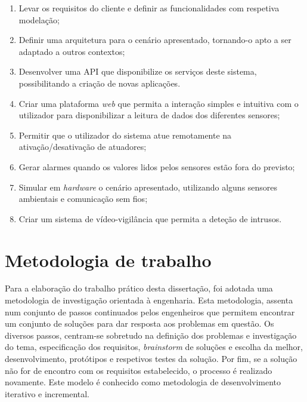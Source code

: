 \begin{enumerate}

	\item Levar os requisitos do cliente e definir as funcionalidades com respetiva modelação; 
	
	\item Definir uma arquitetura para o cenário apresentado, tornando-o apto a ser adaptado a outros contextos; 
	
	\item Desenvolver uma \ac{API} que disponibilize os serviços deste sistema, possibilitando a criação de novas aplicações.   
	
	\item Criar uma plataforma \textit{web} que permita a  interação simples e intuitiva com o utilizador para disponibilizar a leitura de dados dos diferentes sensores; 
	
	\item Permitir que o utilizador do sistema atue remotamente na ativação/desativação de atuadores; 
	
	
	\item Gerar alarmes quando os valores lidos pelos sensores estão fora do previsto; 
	
	\item Simular em \textit{hardware} o cenário apresentado, utilizando alguns sensores ambientais e comunicação sem fios; 
	
	\item Criar um sistema de vídeo-vigilância que permita a deteção de intrusos.

\end{enumerate}










\section{Metodologia de trabalho}
\label{method}


Para a elaboração do trabalho prático desta dissertação, foi adotada uma metodologia de investigação orientada à engenharia. Esta metodologia, assenta num conjunto de passos continuados pelos engenheiros que permitem encontrar um conjunto de soluções para dar resposta aos problemas em questão. Os diversos passos, centram-se sobretudo na definição dos problemas e investigação do tema, especificação dos requisitos, \textit{brainstorm} de soluções e escolha da melhor, desenvolvimento, protótipos e respetivos testes da solução. Por fim, se a solução não for de encontro com os requisitos estabelecido, o processo é realizado novamente\cite{desingprocess}. Este modelo é conhecido como metodologia de desenvolvimento iterativo e incremental. 


